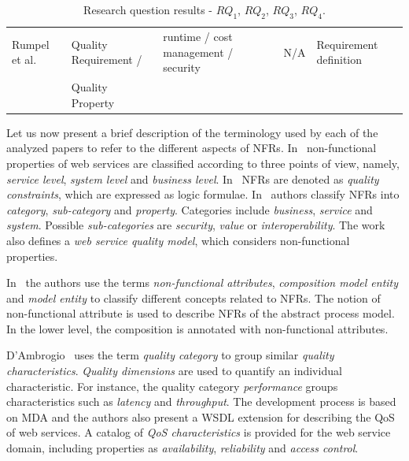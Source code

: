 \documentclass[english,12pt]{article}
\begin{document}
\begin{table}[ht!]
\begin{tabular}{l|l|l|c|l}
   Rumpel et al. \cite{Rumpel2012} & Quality Requirement /  &
  runtime / cost management / security   & N/A  &  Requirement definition 
\\
   & Quality Property  &  &   &  
  \\  
  \hline  
  \hline  
  
\end{tabular} 
\caption{Research question results - $RQ_1$, $RQ_2$, $RQ_3$, $RQ_4$.}
\label{tab:result02b}
\end{table} 
 
 
 
Let us now present a brief description of the terminology used by each of the analyzed papers to refer to the different aspects of NFRs.
In~\cite{Babamir2010,Yeom2006} non-functional properties of web services are classified according to three points of view, namely,  
\textit{service level}, \textit{system level} and \textit{business level}.
In~\cite{Babamir2010} NFRs are denoted as \textit{quality constraints}, which are expressed as logic formulae.
In~\cite{Yeom2006} authors classify NFRs into \textit{category}, \textit{sub-category} and \textit{property}. Categories include \textit{business}, \textit{service} and \textit{system}.
Possible \textit{sub-categories} are \textit{security}, \textit{value} or  \textit{interoperability}. The work also defines a \textit{web service quality model}, which considers non-functional properties. 


In~\cite{XiaoCZBOLH08} the authors use the terms  
\textit{non-functional attributes}, \textit{composition mo\-del entity} and \textit{mo\-del entity}  to classify different concepts related to NFRs.
The notion of non-functional attribute is used to describe NFRs of the abstract process model. In the lower level, the composition is annotated with non-functional attributes.

D'Ambrogio~\cite{DAmbrogio06} uses the term \textit{quality category} to group similar \textit{quality characteristics}. 
\textit{Quality dimensions} are used to quantify an individual characteristic.
For instance, the quality category \textit{performance} groups characteristics such as
\textit{latency} and \textit{throughput}. 
The development process is based on MDA and the authors also present a WSDL extension for describing the QoS of web services. A catalog of \textit{QoS characteristics} is provided for the web service domain, including properties as \textit{availability}, \textit{reliability} and \textit{access control}. 
\end{document}
